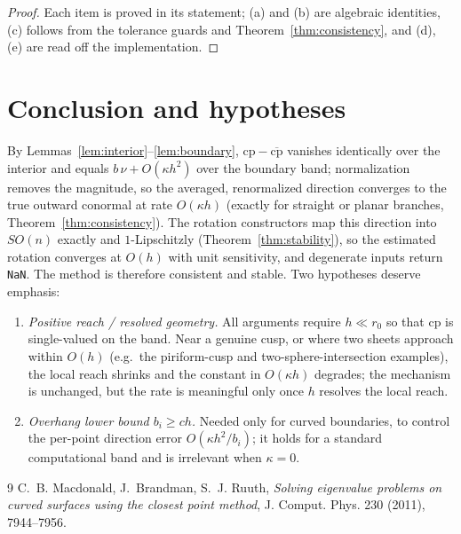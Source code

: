 \documentclass[11pt]{article}
\newcommand{\cp}{\mathrm{cp}}
\newcommand{\cpbar}{\overline{\mathrm{cp}}}
\begin{document}
\begin{proof}
Each item is proved in its statement; (a) and (b) are algebraic
identities, (c) follows from the tolerance guards and
Theorem~\ref{thm:consistency}, and (d), (e) are read off the
implementation.
\end{proof}

\section{Conclusion and hypotheses}

By Lemmas~\ref{lem:interior}--\ref{lem:boundary}, $\cp-\cpbar$ vanishes
identically over the interior and equals $b\,\nu+O(\kappa h^2)$ over the
boundary band; normalization removes the magnitude, so the averaged,
renormalized direction converges to the true outward conormal at rate
$O(\kappa h)$ (exactly for straight or planar branches,
Theorem~\ref{thm:consistency}). The rotation constructors map this
direction into $SO(n)$ exactly and $1$-Lipschitzly
(Theorem~\ref{thm:stability}), so the estimated rotation converges at
$O(h)$ with unit sensitivity, and degenerate inputs return
\texttt{NaN}. The method is therefore consistent and stable. Two
hypotheses deserve emphasis:

\begin{enumerate}
\item \emph{Positive reach / resolved geometry.} All arguments require
  $h\ll r_0$ so that $\cp$ is single-valued on the band. Near a genuine
  cusp, or where two sheets approach within $O(h)$ (e.g.\ the
  piriform-cusp and two-sphere-intersection examples), the local reach
  shrinks and the constant in $O(\kappa h)$ degrades; the mechanism is
  unchanged, but the rate is meaningful only once $h$ resolves the
  local reach.
\item \emph{Overhang lower bound $b_i\ge ch$.} Needed only for curved
  boundaries, to control the per-point direction error
  $O(\kappa h^2/b_i)$; it holds for a standard computational band and
  is irrelevant when $\kappa=0$.
\end{enumerate}

\begin{thebibliography}{9}
C.~B. Macdonald, J.~Brandman, S.~J. Ruuth,
\emph{Solving eigenvalue problems on curved surfaces using the closest
point method},
J. Comput. Phys. 230 (2011), 7944--7956.
\end{thebibliography}
\end{document}
